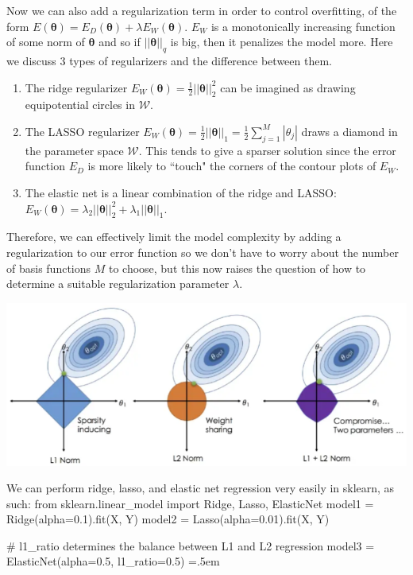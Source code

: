 \documentclass{article}
\theoremstyle{definition}
\newenvironment{cverbatim}
    {\SaveVerbatim{cverb}}
    {\endSaveVerbatim
    \flushleft\fboxrule=0pt\fboxsep=.5em
    \colorbox{cverbbg}{%
      \makebox[\dimexpr\linewidth-2\fboxsep][l]{\BUseVerbatim{cverb}}%
    }
    \endflushleft
  }
\begin{document}
    Now we can also add a regularization term in order to control overfitting, of the form $E(\boldsymbol{\theta}) = E_D (\boldsymbol{\theta}) + \lambda E_W (\boldsymbol{\theta})$. $E_W$ is a monotonically increasing function of some norm of $\boldsymbol{\theta}$ and so if $||\boldsymbol{\theta}||_q$ is big, then it penalizes the model more. Here we discuss 3 types of regularizers and the difference between them. 
    \begin{enumerate}
        \item The ridge regularizer $E_W (\boldsymbol{\theta}) = \frac{1}{2} ||\boldsymbol{\theta}||_2^2$ can be imagined as drawing equipotential circles in $\mathcal{W}$. 

        \item The LASSO regularizer $E_W (\boldsymbol{\theta}) = \frac{1}{2} ||\boldsymbol{\theta}||_1 = \frac{1}{2} \sum_{j=1}^M |\theta_j|$ draws a diamond in the parameter space $\mathcal{W}$. This tends to give a sparser solution since the error function $E_D$ is more likely to ``touch" the corners of the contour plots of $E_W$. 

        \item The elastic net is a linear combination of the ridge and LASSO: $E_W (\boldsymbol{\theta}) = \lambda_2 ||\boldsymbol{\theta}||_2^2 + \lambda_1 ||\boldsymbol{\theta}||_1$. 
    \end{enumerate}
    Therefore, we can effectively limit the model complexity by adding a regularization to our error function so we don't have to worry about the number of basis functions $M$ to choose, but this now raises the question of how to determine a suitable regularization parameter $\lambda$. 
    \begin{center}
        \includegraphics[scale=0.5]{Section_2/regularizers.png}
    \end{center}

    We can perform ridge, lasso, and elastic net regression very easily in sklearn, as such: 
    \begin{cverbatim}
    from sklearn.linear_model import Ridge, Lasso, ElasticNet
    model1 = Ridge(alpha=0.1).fit(X, Y) 
    model2 = Lasso(alpha=0.01).fit(X, Y)

    # l1_ratio determines the balance between L1 and L2 regression
    model3 = ElasticNet(alpha=0.5, l1_ratio=0.5) 
    \end{cverbatim}
\end{document}
